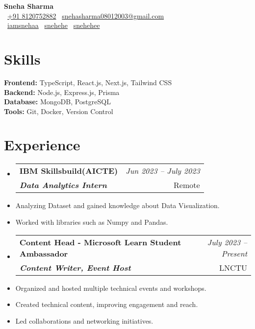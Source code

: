 \documentclass[a4paper,11pt]{article}
\makeatletter
\newcommand{\resumeItem}[1]{\item\small{#1}}
\newcommand{\resumeSubheading}[4]{
\vspace{1mm}\item
    \begin{tabular*}{0.98\textwidth}[t]{l@{\extracolsep{\fill}}r}
        \textbf{#1} & \textit{\footnotesize{#4}} \\
        \textit{\footnotesize{#3}} & \footnotesize{#2}
    \end{tabular*}
    \vspace{-2mm}
}
\makeatother
\begin{document}
\begin{center}
    {\huge\textbf{Sneha Sharma}} \\[3mm] %
    
    \small
    \faPhone\ \href{tel:+91 8120752882}{+91 8120752882} \hspace{10pt} %
    \faEnvelope\ \href{mailto:snehasharma08012003@gmail.com}{snehasharma08012003@gmail.com} \\[2mm]

    \faGithub\ \href{https://github.com/iamsnehaa}{iamsnehaa}\hspace{10pt}
    \faLinkedin\ \href{https://www.linkedin.com/in/snehehe/}{snehehe} \hspace{10pt}
    \faTwitter\ \href{https://x.com/snehehee}{snehehee}
\end{center}
\vspace{-3mm}

\section{\textbf{Skills}}
\small
\textbf{Frontend:} TypeScript, React.js, Next.js, Tailwind CSS \\
\textbf{Backend:} Node.js, Express.js, Prisma \\
\textbf{Database:} MongoDB, PostgreSQL \\
\textbf{Tools:} Git, Docker, Version Control

\section{\textbf{Experience}}
\begin{itemize}[leftmargin=*, labelsep=1mm]
    \resumeSubheading
        {IBM Skillsbuild(AICTE)}{Remote}
        {\textbf{Data Analytics Intern}}{Jun 2023 – July 2023}
        \resumeItem{Analyzing Dataset and gained knowledge about Data Visualization.}
        \resumeItem{Worked with libraries such as Numpy and Pandas.}

    

    \resumeSubheading
        {Content Head - Microsoft Learn Student Ambassador}{LNCTU}
        {\textbf{Content Writer, Event Host}}{July 2023 – Present}
        \resumeItem{Organized and hosted multiple technical events and workshops.}
        \resumeItem{Created technical content, improving engagement and reach.}
        \resumeItem{Led collaborations and networking initiatives.}
\end{itemize}
\end{document}
